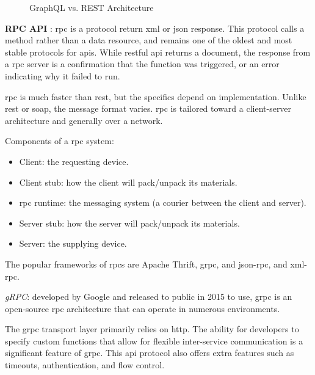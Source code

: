 \begin{multicols}{2}
\begin{figure}[htbp]
            \caption{GraphQL vs. REST Architecture}
            \label{fig:graphqlvsrestarchitecture}
      \end{figure}
      \begin{multicols}{2} %
            \textbf{RPC API} : \acrshort{rpc} is a protocol return \acrshort{xml} or \acrshort{json} response. This protocol
            calls a method rather than a data resource, and remains one of the oldest and most stable protocols for
            \acrshort{api}s. While \acrshort{rest}ful \acrshort{api} returns a document, the response from a \acrshort{rpc}
            server is a confirmation that the function was triggered, or an error indicating  why it failed to run.

            \acrshort{rpc} is much faster than \acrshort{rest}, but the specifics depend on implementation. Unlike
            \acrshort{rest} or \acrshort{soap}, the message format varies. \acrshort{rpc} is tailored toward a client-server
            architecture and generally over a network.

            Components of a \acrshort{rpc} system:
            \begin{itemize}[label=$\star$]
                  \item Client: the requesting device.
                  \item Client stub: how the client will pack/unpack its materials.
                  \item \acrshort{rpc} runtime: the messaging system (a courier between the client and server).
                  \item Server stub: how the server will pack/unpack its materials.
                  \item Server: the supplying device.
            \end{itemize}

            The popular frameworks of \acrshort{rpc}s are Apache Thrift, \acrshort{grpc}, and \acrshort{json}-\acrshort{rpc},
            and \acrshort{xml}-\acrshort{rpc}.

            \textit{gRPC}: developed by Google and released to public in 2015 to use, \acrshort{grpc} is an open-source
            \acrshort{rpc} architecture that can operate in numerous environments.

            The \acrshort{grpc} transport layer primarily relies on \acrshort{http}. The ability for developers to specify
            custom functions that allow for flexible inter-service communication is a significant feature of \acrshort{grpc}.
            This \acrshort{api} protocol also offers extra features such as timeouts, authentication, and flow control.


\end{multicols}
\end{multicols}
